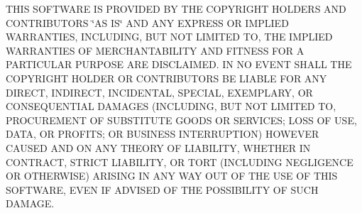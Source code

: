 T\+H\+IS S\+O\+F\+T\+W\+A\+RE IS P\+R\+O\+V\+I\+D\+ED BY T\+HE C\+O\+P\+Y\+R\+I\+G\+HT H\+O\+L\+D\+E\+RS A\+ND C\+O\+N\+T\+R\+I\+B\+U\+T\+O\+RS \char`\"{}\+A\+S I\+S\char`\"{} A\+ND A\+NY E\+X\+P\+R\+E\+SS OR I\+M\+P\+L\+I\+ED W\+A\+R\+R\+A\+N\+T\+I\+ES, I\+N\+C\+L\+U\+D\+I\+NG, B\+UT N\+OT L\+I\+M\+I\+T\+ED TO, T\+HE I\+M\+P\+L\+I\+ED W\+A\+R\+R\+A\+N\+T\+I\+ES OF M\+E\+R\+C\+H\+A\+N\+T\+A\+B\+I\+L\+I\+TY A\+ND F\+I\+T\+N\+E\+SS F\+OR A P\+A\+R\+T\+I\+C\+U\+L\+AR P\+U\+R\+P\+O\+SE A\+RE D\+I\+S\+C\+L\+A\+I\+M\+ED. IN NO E\+V\+E\+NT S\+H\+A\+LL T\+HE C\+O\+P\+Y\+R\+I\+G\+HT H\+O\+L\+D\+ER OR C\+O\+N\+T\+R\+I\+B\+U\+T\+O\+RS BE L\+I\+A\+B\+LE F\+OR A\+NY D\+I\+R\+E\+CT, I\+N\+D\+I\+R\+E\+CT, I\+N\+C\+I\+D\+E\+N\+T\+AL, S\+P\+E\+C\+I\+AL, E\+X\+E\+M\+P\+L\+A\+RY, OR C\+O\+N\+S\+E\+Q\+U\+E\+N\+T\+I\+AL D\+A\+M\+A\+G\+ES (I\+N\+C\+L\+U\+D\+I\+NG, B\+UT N\+OT L\+I\+M\+I\+T\+ED TO, P\+R\+O\+C\+U\+R\+E\+M\+E\+NT OF S\+U\+B\+S\+T\+I\+T\+U\+TE G\+O\+O\+DS OR S\+E\+R\+V\+I\+C\+ES; L\+O\+SS OF U\+SE, D\+A\+TA, OR P\+R\+O\+F\+I\+TS; OR B\+U\+S\+I\+N\+E\+SS I\+N\+T\+E\+R\+R\+U\+P\+T\+I\+ON) H\+O\+W\+E\+V\+ER C\+A\+U\+S\+ED A\+ND ON A\+NY T\+H\+E\+O\+RY OF L\+I\+A\+B\+I\+L\+I\+TY, W\+H\+E\+T\+H\+ER IN C\+O\+N\+T\+R\+A\+CT, S\+T\+R\+I\+CT L\+I\+A\+B\+I\+L\+I\+TY, OR T\+O\+RT (I\+N\+C\+L\+U\+D\+I\+NG N\+E\+G\+L\+I\+G\+E\+N\+CE OR O\+T\+H\+E\+R\+W\+I\+SE) A\+R\+I\+S\+I\+NG IN A\+NY W\+AY O\+UT OF T\+HE U\+SE OF T\+H\+IS S\+O\+F\+T\+W\+A\+RE, E\+V\+EN IF A\+D\+V\+I\+S\+ED OF T\+HE P\+O\+S\+S\+I\+B\+I\+L\+I\+TY OF S\+U\+CH D\+A\+M\+A\+GE. 